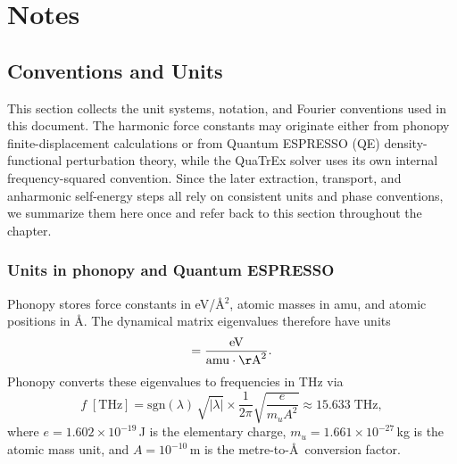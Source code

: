 \chapter{Notes}
\label{ch:notes}

\section{Conventions and Units}
\label{sec:conventions_units}

This section collects the unit systems, notation, and Fourier
conventions used in this document.  The harmonic force
constants may originate either from phonopy finite-displacement
calculations or from Quantum ESPRESSO (QE) density-functional
perturbation theory, while the QuaTrEx solver uses its own internal
frequency-squared convention.  Since the later extraction, transport,
and anharmonic self-energy steps all rely on consistent units and phase
conventions, we summarize them here once and refer back to this section
throughout the chapter.

\subsection{Units in phonopy and Quantum ESPRESSO}
\label{sec:phonopy_units}

Phonopy stores force constants in eV/\AA$^2$, atomic masses in amu, and
atomic positions in \AA.  The dynamical matrix eigenvalues therefore
have units
\begin{equation}
  [\lambda] = \frac{\mathrm{eV}}{\mathrm{amu}\cdot\mathrm{\AA}^2}.
\end{equation}
Phonopy converts these eigenvalues to frequencies in THz via
\begin{equation}\label{eq:VaspToTHz}
  f\;[\mathrm{THz}]
  = \mathrm{sgn}(\lambda)\,\sqrt{|\lambda|}
    \times
    \frac{1}{2\pi}\sqrt{\frac{e}{m_u A^2}}  \approx 15.633\;\mathrm{THz},
\end{equation}
where $e = 1.602\times 10^{-19}$\,J is the elementary charge,
$m_u = 1.661\times 10^{-27}$\,kg is the atomic mass unit, and
$A = 10^{-10}$\,m is the metre-to-\AA\ conversion factor.

